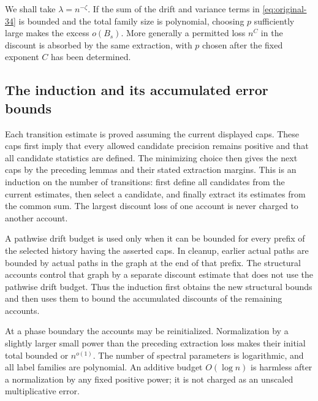 We shall take $\lambda=n^{-\zeta}$. If the sum of the drift and variance
terms in \eqref{eq:original-34} is bounded and the total family size is
polynomial, choosing $p$ sufficiently large makes the excess $o(B_s)$.
More generally a permitted loss $n^C$ in the discount is absorbed by the
same extraction, with $p$ chosen after the fixed exponent $C$ has been
determined.

\subsection{The induction and its accumulated error bounds}
Each transition estimate is proved assuming the current displayed caps.
These caps first imply that every allowed candidate precision remains
positive and that all candidate statistics are defined.  The minimizing
choice then gives the next caps by the preceding lemmas and their stated
extraction margins.  This is an induction on the number of transitions: first define all
candidates from the current estimates, then select a candidate, and
finally extract its estimates from the common sum. The largest discount
loss of one account is never charged to another account.

A pathwise drift budget is used only when it can be bounded for every
prefix of the selected history having the asserted caps.  In cleanup,
earlier actual paths are bounded by actual paths in the graph at the end
of that prefix.  The structural accounts control that graph by a
separate discount estimate that does not use the pathwise drift budget.
Thus the induction first obtains the new structural bounds and then uses
them to bound the accumulated discounts of the remaining accounts.

At a phase boundary the accounts may be reinitialized.  Normalization by
a slightly larger small power than the preceding extraction loss makes
their initial total bounded or $n^{o(1)}$.  The number of spectral
parameters is logarithmic, and all label families are polynomial.  An
additive budget $O(\log n)$ is harmless after a normalization by any fixed
positive power; it is not charged as an unscaled multiplicative error.
